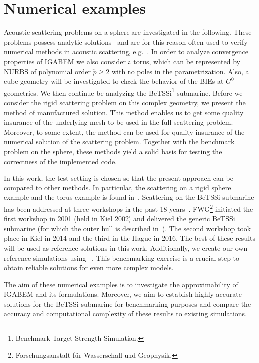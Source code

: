 \section{Numerical examples}
\label{Sec3:resultsDisc}
Acoustic scattering problems on a sphere are investigated in the following. These problems possess analytic solutions~\cite{Venas2019e3s} and are for this reason often used to verify numerical methods in acoustic scattering, e.g.~\cite{Gerdes1996so3,Ihlenburg1998fea,Simpson2014aib,Gerdes1998tcv,Gerdes1999otp,Coox2017aii}. In order to analyze convergence properties of IGABEM we also consider a torus, which can be represented by NURBS of polynomial order $\check{p}\geq 2$ with no poles in the parametrization. Also, a cube geometry will be investigated to check the behavior of the BIEs at $G^0$-geometries. We then continue be analyzing the BeTSSi\footnote{Benchmark Target Strength Simulation.} submarine. Before we consider the rigid scattering problem on this complex geometry, we present the method of manufactured solution. This method enables us to get some quality insurance of the underlying mesh to be used in the full scattering problem. Moreover, to some extent, the method can be used for quality insurance of the numerical solution of the scattering problem. Together with the benchmark problem on the sphere, these methods yield a solid basis for testing the correctness of the implemented code.

In this work, the test setting is chosen so that the present approach can be compared to other methods. In particular, the scattering on a rigid sphere example and the torus example is found in~\cite{Simpson2014aib}. Scattering on the BeTSSi submarine has been addressed at three workshops in the past 18 years~\cite{Nolte2014bib}. FWG\footnote{Forschungsanstalt f\"{u}r Wasserschall und Geophysik.} initiated the first workshop in 2001 (held in Kiel 2002) and delivered the generic BeTSSi submarine (for which the outer hull is described in~). The second workshop took place in Kiel in 2014 and the third in the Hague in 2016. The best of these results will be used as reference solutions in this work. Additionally, we create our own reference simulations using \COMSOL~\cite{ComsolV54}. This benchmarking exercise is a crucial step to obtain reliable solutions for even more complex models.

The aim of these numerical examples is to investigate the approximability of IGABEM and its formulations. Moreover, we aim to establish highly accurate solutions for the BeTSSi submarine for benchmarking purposes and compare the accuracy and computational complexity of these results to existing simulations.

